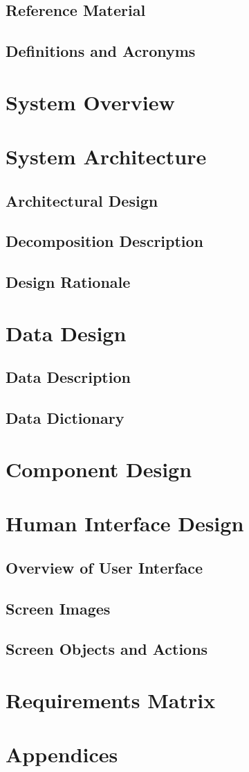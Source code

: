 \documentclass[a4paper,12pt]{report}
\begin{document}
		\section{Reference Material}
		\section{Definitions and Acronyms}
	\chapter{System Overview}
	\chapter{System Architecture}
		\section{Architectural Design}
		\section{Decomposition Description}
		\section{Design Rationale}
	\chapter{Data Design}
		\section{Data Description}
		\section{Data Dictionary}
	\chapter{Component Design}
	\chapter{Human Interface Design}
		\section{Overview of User Interface}
		\section{Screen Images}
		\section{Screen Objects and Actions}
	\chapter{Requirements Matrix}
	\chapter{Appendices}
\end{document}
